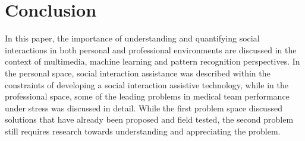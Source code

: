 \documentclass{article} %
\begin{document}
\vspace{-0.1in}
\section{Conclusion}
\vspace{-0.2in}
In this paper, the importance of understanding and quantifying social interactions in both personal and professional environments are discussed in the context of multimedia, machine learning and pattern recognition perspectives. In the personal space, social interaction assistance was described within the constraints of developing a social interaction assistive technology, while in the professional space, some of the leading problems in medical team performance under stress was discussed in detail. While the first problem space discussed solutions that have already been proposed and field tested, the second problem still requires research towards understanding and appreciating the problem.
\end{document}
